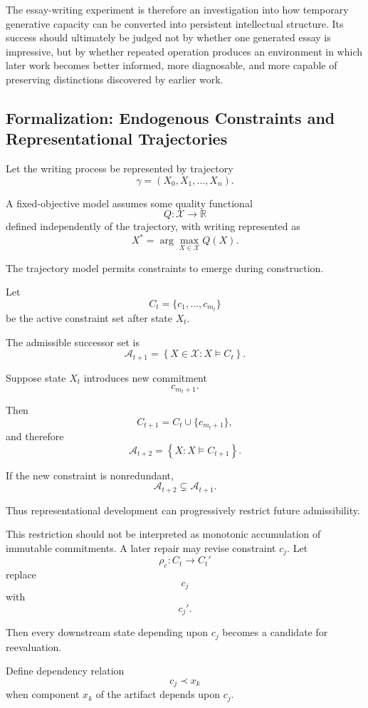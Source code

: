 \documentclass[11pt]{article}
\begin{document}
The essay-writing experiment is therefore an investigation into how temporary generative capacity can be converted into persistent intellectual structure. Its success should ultimately be judged not by whether one generated essay is impressive, but by whether repeated operation produces an environment in which later work becomes better informed, more diagnosable, and more capable of preserving distinctions discovered by earlier work.

\subsection{Formalization: Endogenous Constraints and Representational Trajectories}

Let the writing process be represented by trajectory
\[
    \gamma
    =
    (X_0,X_1,\ldots,X_n).
\]

A fixed-objective model assumes some quality functional
\[
    Q:\mathcal{X}\rightarrow\mathbb{R}
\]
defined independently of the trajectory, with writing represented as
\[
    X^\ast
    =
    \arg\max_{X\in\mathcal{X}}Q(X).
\]

The trajectory model permits constraints to emerge during construction.

Let
\[
    C_t
    =
    \{c_1,\ldots,c_{m_t}\}
\]
be the active constraint set after state \(X_t\).

The admissible successor set is
\[
    \mathcal{A}_{t+1}
    =
    \left\{
        X\in\mathcal{X}:
        X\models C_t
    \right\}.
\]

Suppose state \(X_t\) introduces new commitment
\[
    c_{m_t+1}.
\]

Then
\[
    C_{t+1}
    =
    C_t\cup\{c_{m_t+1}\},
\]
and therefore
\[
    \mathcal{A}_{t+2}
    =
    \left\{
        X:
        X\models C_{t+1}
    \right\}.
\]

If the new constraint is nonredundant,
\[
    \mathcal{A}_{t+2}
    \subsetneq
    \mathcal{A}_{t+1}.
\]

Thus representational development can progressively restrict future admissibility.

This restriction should not be interpreted as monotonic accumulation of immutable commitments. A later repair may revise constraint \(c_j\). Let
\[
    \rho_c:
    C_t\rightarrow C_t'
\]
replace
\[
    c_j
\]
with
\[
    c_j'.
\]

Then every downstream state depending upon \(c_j\) becomes a candidate for reevaluation.

Define dependency relation
\[
    c_j\prec x_k
\]
when component \(x_k\) of the artifact depends upon \(c_j\).
\end{document}

